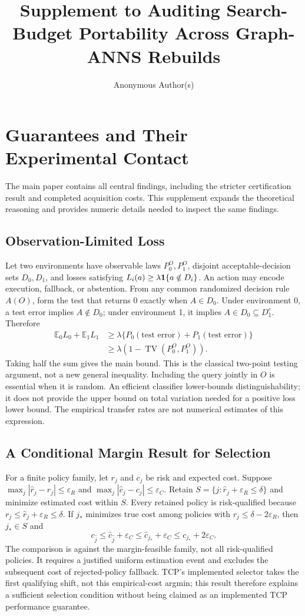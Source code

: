 \documentclass[sigconf,anonymous]{acmart}
\title{Supplement to Auditing Search-Budget Portability Across Graph-ANNS Rebuilds}
\author{Anonymous Author(s)}
\begin{document}
\maketitle
\appendix
\section{Guarantees and Their Experimental Contact}
The main paper contains all central findings, including the stricter certification result and completed acquisition costs. This supplement expands the theoretical reasoning and provides numeric details needed to inspect the same findings.

\subsection{Observation-Limited Loss}
Let two environments have observable laws $P_0^O,P_1^O$, disjoint acceptable-decision sets $D_0,D_1$, and losses satisfying $L_i(a)\ge\lambda\mathbf{1}\{a\notin D_i\}$. An action may encode execution, fallback, or abstention. From any common randomized decision rule $A(O)$, form the test that returns 0 exactly when $A\in D_0$. Under environment 0, a test error implies $A\notin D_0$; under environment 1, it implies $A\in D_0\subseteq D_1^c$. Therefore
\begin{align*}
 \mathbb E_0L_0+\mathbb E_1L_1
 &\ge\lambda\{P_0(\text{test error})+P_1(\text{test error})\}\\
 &\ge\lambda(1-\operatorname{TV}(P_0^O,P_1^O)).
\end{align*}
Taking half the sum gives the main bound. This is the classical two-point testing argument, not a new general inequality. Including the query jointly in $O$ is essential when it is random. An efficient classifier lower-bounds distinguishability; it does not provide the upper bound on total variation needed for a positive loss lower bound. The empirical transfer rates are not numerical estimates of this expression.

\subsection{A Conditional Margin Result for Selection}
For a finite policy family, let $r_j$ and $c_j$ be risk and expected cost. Suppose $\max_j|\hat r_j-r_j|\le\varepsilon_R$ and $\max_j|\hat c_j-c_j|\le\varepsilon_C$. Retain $S=\{j:\hat r_j+\varepsilon_R\le\delta\}$ and minimize estimated cost within $S$. Every retained policy is risk-qualified because $r_j\le\hat r_j+\varepsilon_R\le\delta$. If $j_*$ minimizes true cost among policies with $r_j\le\delta-2\varepsilon_R$, then $j_*\in S$ and
\[
 c_{\hat j}\le\hat c_{\hat j}+\varepsilon_C
 \le\hat c_{j_*}+\varepsilon_C\le c_{j_*}+2\varepsilon_C.
\]
The comparison is against the margin-feasible family, not all risk-qualified policies. It requires a justified uniform estimation event and excludes the subsequent cost of rejected-policy fallback. TCP's implemented selector takes the first qualifying shift, not this empirical-cost argmin; this result therefore explains a sufficient selection condition without being claimed as an implemented TCP performance guarantee.
\end{document}
